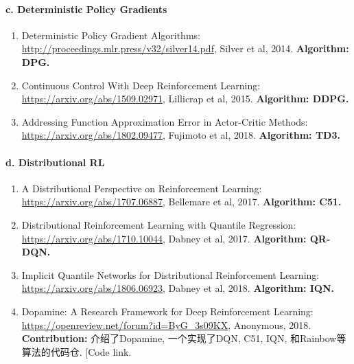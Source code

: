 \documentclass[lang=cn,11pt,a4paper]{elegant_template}
\begin{document}
\paragraph{c. Deterministic Policy Gradients}
\begin{enumerate}
    \item Deterministic Policy Gradient Algorithms:\\ \href{http://proceedings.mlr.press/v32/silver14.pdf}{http://proceedings.mlr.press/v32/silver14.pdf}, Silver et al, 2014. \textbf{Algorithm: DPG.}
    \item Continuous Control With Deep Reinforcement Learning:\\ \href{https://arxiv.org/abs/1509.02971}{https://arxiv.org/abs/1509.02971}, Lillicrap et al, 2015. \textbf{Algorithm: DDPG.}
    \item Addressing Function Approximation Error in Actor-Critic Methods:\\ \href{https://arxiv.org/abs/1802.09477}{https://arxiv.org/abs/1802.09477}, Fujimoto et al, 2018. \textbf{Algorithm: TD3.}
\end{enumerate}

\paragraph{d. Distributional RL}
\begin{enumerate}
    \item A Distributional Perspective on Reinforcement Learning:\\ \href{https://arxiv.org/abs/1707.06887}{https://arxiv.org/abs/1707.06887}, Bellemare et al, 2017. \textbf{Algorithm: C51.}
    \item Distributional Reinforcement Learning with Quantile Regression:\\ \href{https://arxiv.org/abs/1710.10044}{https://arxiv.org/abs/1710.10044}, Dabney et al, 2017. \textbf{Algorithm: QR-DQN.}
    \item Implicit Quantile Networks for Distributional Reinforcement Learning:\\ \href{https://arxiv.org/abs/1806.06923}{https://arxiv.org/abs/1806.06923}, Dabney et al, 2018. \textbf{Algorithm: IQN.}
    \item Dopamine: A Research Framework for Deep Reinforcement Learning:\\ \href{https://openreview.net/forum?id=ByG_3s09KX}{https://openreview.net/forum?id=ByG\_3s09KX}, Anonymous, 2018. \textbf{Contribution:} 介绍了Dopamine, 一个实现了DQN, C51, IQN, 和Rainbow等算法的代码仓. [Code link.
\end{enumerate}
\end{document}
